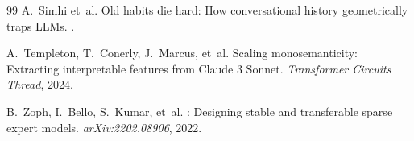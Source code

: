\documentclass[11pt,a4paper]{article}
\begin{document}
\begin{thebibliography}{99}
A.~Simhi et~al.
\newblock Old habits die hard: How conversational history geometrically traps {LLM}s.
.

A.~Templeton, T.~Conerly, J.~Marcus, et~al.
\newblock Scaling monosemanticity: Extracting interpretable features from {C}laude 3 {S}onnet.
\newblock \emph{Transformer Circuits Thread}, 2024.

B.~Zoph, I.~Bello, S.~Kumar, et~al.
: Designing stable and transferable sparse expert models.
\newblock \emph{arXiv:2202.08906}, 2022.

\end{thebibliography}
\end{document}

